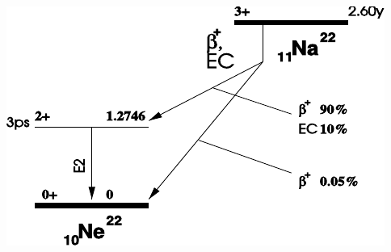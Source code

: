 \begin{multicols}{2}
\begin{center}
        \label{fig:133BaDecayScheme}
    \end{center}
\endminipage
%
\vspace{10mm}
%
\minipage{\linewidth}
    \begin{center}
        \captionsetup{type=figure}
        \begin{adjustbox}{max width=\linewidth, keepaspectratio}
            \includegraphics[]{pdf/DecayScheme22Na}
        \end{adjustbox}
        \label{fig:22NaDecayScheme}
    \end{center}
\endminipage
%
\newpage
%
\end{multicols}
%
